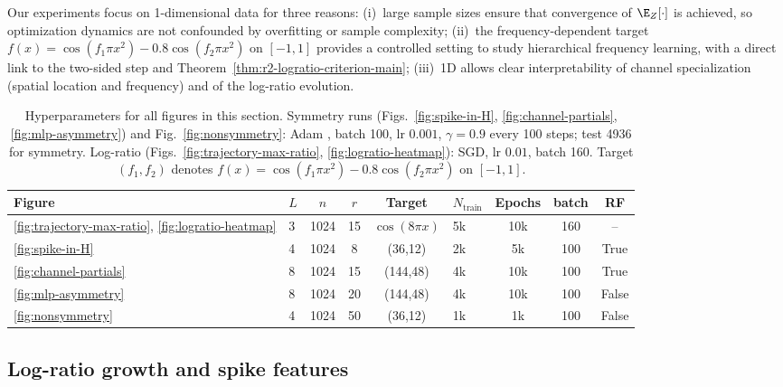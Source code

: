 \documentclass[nohyperref]{article}
\theoremstyle{plain}
\theoremstyle{definition}
\theoremstyle{remark}
\begin{document}
\label{sec:experiments}
\captionsetup{font=small}
Our experiments focus on 1-dimensional data for three reasons: (i)~large sample sizes ensure that convergence of $\E_Z[\cdot]$ is achieved, so optimization dynamics are not confounded by overfitting or sample complexity; (ii)~the frequency-dependent target $f(x)=\cos(f_1\pi x^2)-0.8\cos(f_2\pi x^2)$ on $[-1,1]$ provides a controlled setting to study hierarchical frequency learning, with a direct link to the two-sided step and Theorem~\ref{thm:r2-logratio-criterion-main}; (iii)~1D allows clear interpretability of channel specialization (spatial location and frequency) and of the log-ratio evolution.



\begin{table}[h!]
    \centering
    \caption{Hyperparameters for all figures in this section. Symmetry runs (Figs.~\ref{fig:spike-in-H}, \ref{fig:channel-partials}, \ref{fig:mlp-asymmetry}) and Fig.~\ref{fig:nonsymmetry}: Adam \cite{kingma2015adam}, batch 100, lr $0.001$, $\gamma{=}0.9$ every 100 steps; test 4936 for symmetry. Log-ratio (Figs.~\ref{fig:trajectory-max-ratio}, \ref{fig:logratio-heatmap}): SGD, lr $0.01$, batch 160. Target $(f_1,f_2)$ denotes $f(x)=\cos(f_1\pi x^2)-0.8\cos(f_2\pi x^2)$ on $[-1,1]$.}
    \label{tab:num-hparams}
    \small
    \setlength{\tabcolsep}{3pt}
    \begin{tabular}{@{}llccclccc@{}}
    \toprule
    Figure & $L$ & $n$ & $r$ & Target & $N_\textrm{train}$ & Epochs & batch & RF \\
    \midrule
    \ref{fig:trajectory-max-ratio}, \ref{fig:logratio-heatmap} & 3 & 1024 & 15 & $\cos(8\pi x)$ & 5k & 10k & 160 & -- \\
    \ref{fig:spike-in-H} & 4 & 1024 & 8 & (36,12) & 2k & 5k & 100 & True \\
    \ref{fig:channel-partials} & 8 & 1024 & 15 & (144,48) & 4k & 10k & 100 & True \\
    \ref{fig:mlp-asymmetry} & 8 & 1024 & 20 & (144,48) & 4k & 10k & 100 & False \\
    \ref{fig:nonsymmetry} & 4 & 1024 & 50 & (36,12) & 1k & 1k & 100 & False \\
    \bottomrule
    \end{tabular}
\end{table}


\subsection{Log-ratio growth and spike features}
\label{sec:meanfield-analysis}
\end{document}
